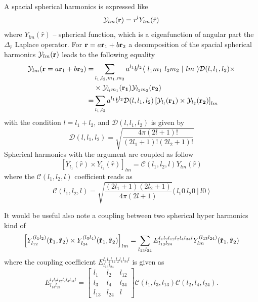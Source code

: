 \documentclass[12pt,a4paper,twoside]{article}
\begin{document}
  A spacial spherical harmonics is expressed like
  \begin{equation}
  \mathcal{Y}_{lm}({\bf r}) = r^{l} Y_{lm}(\hat{r})
  \end{equation}
  where $Y_{lm}(\hat{r})$  -- spherical function, which is a eigenfunction of angular part the $\Delta_{\hat{r}}$ Laplace operator.
  For ${\bf r} = a{\bf r}_1+b {\bf r}_2$ a decomposition of the spacial spherical harmonics $\mathcal{Y}_{lm}({\bf r})$ leads to the following equality
  \begin{align}
  \mathcal{Y}_{lm}({\bf r} = a{\bf r}_1+b {\bf r}_2)=& \sum_{l_1,l_2,m_1,m_2} a^{l_1} b^{l_2}
  \langle ~ l_1 m_1~l_2 m_2~ \vert ~l m~  \rangle \mathcal{D}(l,l_1,l_2) \times \nonumber \\
   & \times \mathcal{Y}_{l_l m_1}({\bf r_1})  \mathcal{Y}_{l_2 m_2}({\bf r_2}) \nonumber \\
   = & \sum_{l_1,l_2} a^{l_1} b^{l_2}
   \mathcal{D}(l,l_1,l_2) \left[ \mathcal{Y}_{l_l}({\bf r_1}) \times \mathcal{Y}_{l_2}({\bf r_2}) \right]_{lm} 
   \label{sphHarmDecomp}
  \end{align}
  with the condition $l=l_1+l_2$, and $\mathcal{D}(l,l_1,l_2) $ is given by
  \begin{equation}
  \mathcal{D}(l,l_1,l_2)  = \sqrt{\frac{4 \pi (2l+1)!}{(2l_1+1)! (2l_2+1)!}}
  \end{equation}
Spherical harmonics with the argument are coupled as follow
\begin{equation}
\left[ Y_{l_1}(\hat{r}) \times Y_{l_2}(\hat{r})\right]_{lm} =  \mathcal{C}(l_1,l_2,l) Y_{lm}(\hat{r})
\end{equation}
where the $\mathcal{C}(l_1,l_2,l)$ coefficient reads as
\begin{equation}
\mathcal{C}(l_1,l_2,l) = \sqrt{\frac{(2l_1+1)(2l_2+1)}{4 \pi (2l+1)}} \langle ~ l_1 0~l_2 0~ \vert ~l 0~  \rangle
\end{equation}

It would be useful also note a coupling between two spherical hyper harmonics kind of
\begin{equation}
\left[ Y^{(l_1l_2)}_{l_{12}}(\hat{{\bf r}}_1,\hat{{\bf r}}_2) \times Y^{(l_3l_4)}_{l_{34}}(\hat{{\bf r}}_1,\hat{{ \bf r}}_2) \right]_{lm}= \sum_{l_{13}l_{24}} {E}^{l_1l_2l_{12}l_2l_4l_{34}l}_{l_{13}l_{24}}  Y^{(l_{13}l_{24})}_{lm}(\hat{{\bf r}}_1,\hat{{\bf r}}_2)
\label{hyperSphTrans}
\end{equation}
where the coupling coefficient ${E}^{l_1l_2l_{12}l_2l_4l_{34}l}_{l_{13}l_{24}}$ is given as
\begin{equation}
{E}^{l_1l_2l_{12}l_2l_4l_{34}l}_{l_{13}l_{24}} = 
\begin{bmatrix}
l_1 & l_2 & l_{12} \\ 
l_3 & l_4 & l_{34} \\ 
l_{13} & l_{24} & l
\end{bmatrix}
\mathcal{C}(l_1,l_3,l_{13})\mathcal{C}(l_2,l_4,l_{24}).
\end{equation}
\end{document}
